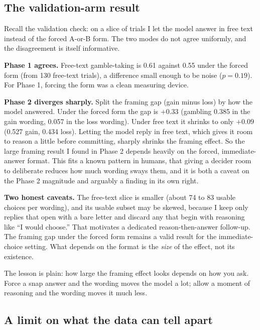 \documentclass[11pt]{article}
\begin{document}
\subsection{The validation-arm result}

Recall the validation check: on a slice of trials I let the model answer in free text instead of the
forced A-or-B form. The two modes do not agree uniformly, and the disagreement is itself informative.

\begin{asidebox}
\textbf{Phase 1 agrees.} Free-text gamble-taking is 0.61 against 0.55 under the forced form (from 130
free-text trials), a difference small enough to be noise ($p = 0.19$). For Phase 1, forcing the form was
a clean measuring device.

\smallskip
\textbf{Phase 2 diverges sharply.} Split the framing gap (gain minus loss) by how the model answered.
Under the forced form the gap is $+0.33$ (gambling 0.385 in the gain wording, 0.057 in the loss wording).
Under free text it shrinks to only $+0.09$ (0.527 gain, 0.434 loss). Letting the model reply in free text,
which gives it room to reason a little before committing, sharply shrinks the framing effect. So the large
framing result I found in Phase 2 depends heavily on the forced, immediate-answer format. This fits a
known pattern in humans, that giving a decider room to deliberate reduces how much wording sways them, and
it is both a caveat on the Phase 2 magnitude and arguably a finding in its own right.

\smallskip
\textbf{Two honest caveats.} The free-text slice is smaller (about 74 to 83 usable choices per wording),
and its usable subset may be skewed, because I keep only replies that open with a bare letter and discard
any that begin with reasoning like ``I would choose.'' That motivates a dedicated reason-then-answer
follow-up. The framing gap under the forced form remains a valid result for the immediate-choice setting.
What depends on the format is the \emph{size} of the effect, not its existence.
\end{asidebox}

The lesson is plain: how large the framing effect looks depends on how you ask. Force a snap answer and
the wording moves the model a lot; allow a moment of reasoning and the wording moves it much less.

\subsection{A limit on what the data can tell apart}
\end{document}
